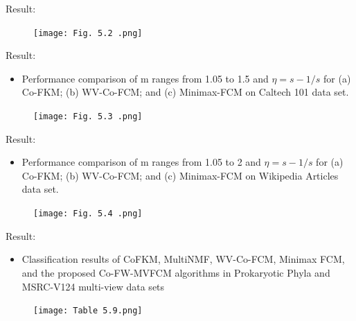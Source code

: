 \documentclass[compress,sky blue]{beamer}
\begin{document}
\begin{frame}{Result:  }

\begin{figure}
\texttt{[image: Fig. 5.2 .png]}
\end{figure}

\end{frame}


\begin{frame}{Result:  }

\begin{itemize}
\item \scriptsize{Performance comparison of m ranges from 1.05 to 1.5 and $\eta=s-1/s$ for (a) Co-FKM; (b) WV-Co-FCM; and (c) Minimax-FCM on Caltech 101 data set.}
\end{itemize}

\begin{figure}
\texttt{[image: Fig. 5.3 .png]}
\end{figure}
\end{frame}

\begin{frame}{Result:  }

\begin{itemize}
\item \scriptsize{Performance comparison of m ranges from 1.05 to 2 and $\eta=s-1/s$  for (a) Co-FKM; (b) WV-Co-FCM; and (c) Minimax-FCM on Wikipedia Articles data set.}
\end{itemize}


\begin{figure}
\texttt{[image: Fig. 5.4 .png]}
\end{figure}
\end{frame}

\begin{frame}{Result:  }

\begin{itemize}
\item \scriptsize{Classification results of CoFKM, MultiNMF, WV-Co-FCM, Minimax FCM, and the proposed Co-FW-MVFCM algorithms in Prokaryotic Phyla and MSRC-V124 multi-view data sets}
\end{itemize}


\begin{figure}
\texttt{[image: Table 5.9.png]}
\end{figure}
\end{frame}
\end{document}
